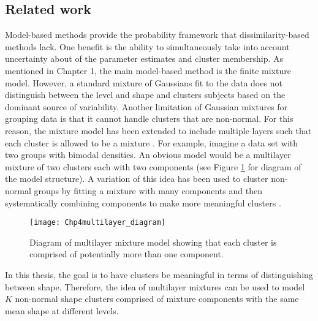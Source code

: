 \subsection{Related work}
Model-based methods provide the probability framework that dissimilarity-based methods lack. One benefit is the ability to simultaneously take into account uncertainty about of the parameter estimates and cluster membership. As mentioned in Chapter 1, the main model-based method is the finite mixture model. However, a standard mixture of Gaussians fit to the data does not distinguish between the level and shape and clusters subjects based on the dominant source of variability. Another limitation of Gaussian mixtures for grouping data is that it cannot handle clusters that are non-normal. For this reason, the mixture model has been extended to include multiple layers such that each cluster is allowed to be a mixture \cite{li2005}.  For example, imagine a data set with two groups with bimodal densities. An obvious model would be a multilayer mixture of two clusters each with two components (see Figure \ref{fig:dia} for diagram of the model structure). A variation of this idea has been used to cluster non-normal groups by fitting a mixture with many components and then systematically combining components to make more meaningful clusters \cite{hennig2010}. 
\begin{figure}[h]
\centering
\texttt{[image: Chp4multilayer\_diagram]}
\label{fig:dia}
\caption{Diagram of multilayer mixture model showing that each cluster is comprised of potentially more than one component.}
\end{figure}

In this thesis, the goal is to have clusters be meaningful in terms of distinguishing between shape. Therefore, the idea of multilayer mixtures can be used to model $K$ non-normal shape clusters comprised of mixture components with the same mean shape at different levels.



